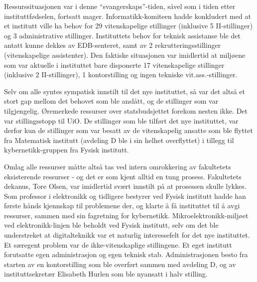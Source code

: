 Ressurssituasjonen var i denne ``svangerskaps''-tiden, såvel som i tiden etter instituttfødselen, fortsatt mager. Informatikk-komiteen hadde konkludert med at et institutt ville ha behov for 29 vitenskapelige stillinger (inklusive 5 II-stillinger) og 3 administrative stillinger. Instituttets behov for teknisk assistanse ble det antatt kunne dekkes av EDB-senteret, samt av 2 rekrutteringsstillinger (vitenskapelige assistenter). Den faktiske situasjonen var imidlertid at miljøene som var aktuelle i instituttet bare disponerte 17 vitenskapelige stillinger (inklusive 2 II-stillinger), 1 kontorstilling og ingen tekniske vit.ass.-stillinger.

Selv om alle syntes sympatisk innstilt til det nye instituttet, så var det altså et stort gap mellom det behovet som ble anslått, og de stillinger som var tilgjengelig. Øremerkede ressurser over statsbudsjettet forekom nesten ikke. Det var stillingsstopp til UiO. De stillinger som ble tilført det nye instituttet, var derfor kun de stillinger som var besatt av de vitenskapelig ansatte som ble flyttet fra Matematisk institutt (avdeling D ble i sin helhet
overflyttet) i tillegg til kybernetikk-gruppen fra Fysisk institutt.

Omlag alle ressurser måtte altså tas ved intern omrokkering av fakultetets eksisterende ressurser - og det er som kjent alltid en tung prosess. Fakultetets dekanus, Tore Olsen, var imidlertid svært innstilt på at prosessen skulle lykkes. Som professor i elektronikk og tidligere bestyrer ved Fysisk institutt hadde han første hånds kjennskap til problemene der, og klarte å få instituttet til å avgi ressurser, sammen med sin fagretning for kybernetikk. Mikroelektronikk-miljøet ved elektronikk-linjen ble beholdt ved Fysisk institutt, selv om det ble understreket at digitalteknikk var et naturlig interessefelt for det nye instituttet. Et særegent problem var de ikke-vitenskaplige stillingene. Et eget institutt forutsatte egen administrasjon og egen teknisk stab. Administrasjonen besto fra starten av en kontorstilling som ble overført sammen med avdeling D, og av instituttsekretær Elisabeth Hurlen som ble nyansatt i halv stilling.

